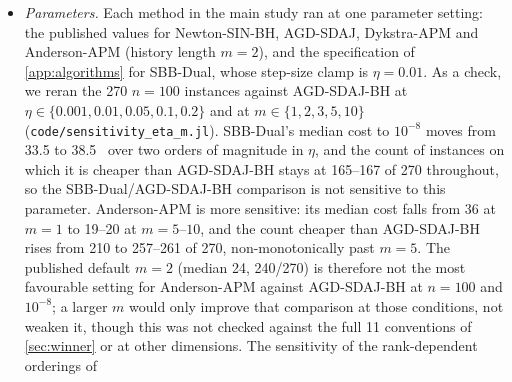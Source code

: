 \begin{itemize}
    solver, at least twice the $\le\!1.50\times$ spread between solvers
    within one session, so per-\EVD\ ratios that differ by less than about 50\%
    should not be read as ordered, and the specific rank of the middle four
    or five solvers, by either \EVD\ count or wall-clock time, should not be
    treated as a fixed property of the methods (\cref{sec:evd-unit}). Only
    the leading position (Newton-SIN-BH cheapest overall) is robust across
    every session; Dykstra-APM is dearest overall in 8 of the 10 sessions
    across both dimensions, but not all. A swing of this size, uniform across
    every solver in a session (\cref{sec:evd-unit}), is consistent with a
    platform-level cause such as thermal throttling or a power-state change on
    a laptop-class part rather than with anything solver-specific; we did not
    pin the CPU power plan or record clock frequency during these sessions,
    so we cannot rule this out. This is itself an argument against reading
    wall-clock time alone as a stable property of a method on this kind of
    hardware, which is why we report \EVD\ counts as the primary unit of cost
    throughout and wall-clock time only as a secondary check.
  \item \emph{Parameters.} Each method in the main study ran at one parameter
    setting: the published values for Newton-SIN-BH, AGD-SDAJ, Dykstra-APM and
    Anderson-APM (history length $m=2$), and the specification of
    \cref{app:algorithms} for SBB-Dual, whose step-size clamp is $\eta=0.01$.
    As a check, we reran the 270 $n=100$ instances against AGD-SDAJ-BH at
    $\eta\in\{0.001,0.01,0.05,0.1,0.2\}$ and at
    $m\in\{1,2,3,5,10\}$ (\texttt{code/sensitivity\_eta\_m.jl}). SBB-Dual's
    median cost to $10^{-8}$ moves from 33.5 to 38.5 \EVDs\ over two orders of
    magnitude in $\eta$, and the count of instances on which it is cheaper
    than AGD-SDAJ-BH stays at 165--167 of 270 throughout, so the
    SBB-Dual/AGD-SDAJ-BH comparison is not sensitive to this parameter.
    Anderson-APM is more
    sensitive: its median cost falls from 36 at $m=1$ to 19--20 at $m=5$--$10$,
    and the count cheaper than AGD-SDAJ-BH rises from 210 to 257--261 of 270,
    non-monotonically past $m=5$. The published default $m=2$ (median 24,
    240/270) is therefore not the most favourable setting for Anderson-APM
    against AGD-SDAJ-BH at $n=100$ and $10^{-8}$; a larger $m$ would only
    improve that comparison at those conditions, not weaken it, though this
    was not checked against the full 11 conventions of \cref{sec:winner} or
    at other dimensions. The sensitivity of the rank-dependent orderings of

\end{itemize}
